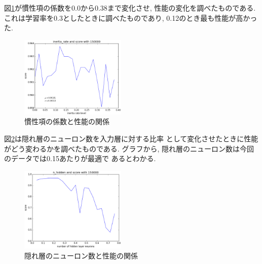 \documentclass[10pt,a4paper,twocolumn]{jarticle}
\begin{document}
図\ref{fig:inertia-rate-test}が慣性項の係数を0.0から0.38まで変化させ, 
性能の変化を調べたものである. 
これは学習率を0.3としたときに調べたものであり, 
0.12のとき最も性能が高かった. 
\begin{figure}[htbp]
  \centering
  \includegraphics[width=0.45\textwidth]{assets/img/inertia_rate_test_mnist.eps}
  \caption{慣性項の係数と性能の関係}
  \label{fig:inertia-rate-test}
\end{figure}

図\ref{fig:hidden-layer-analyze}は隠れ層のニューロン数を入力層に対する比率
として変化させたときに性能がどう変わるかを調べたものである. 
グラフから, 隠れ層のニューロン数は今回のデータでは0.15あたりが最適で
あるとわかる. 
\begin{figure}[htbp]
  \centering
  \includegraphics[width=0.45\textwidth]{assets/img/n_hidden_test_mnist_score.eps}
  \caption{隠れ層のニューロン数と性能の関係}
  \label{fig:hidden-layer-analyze}
\end{figure}



\end{document}
